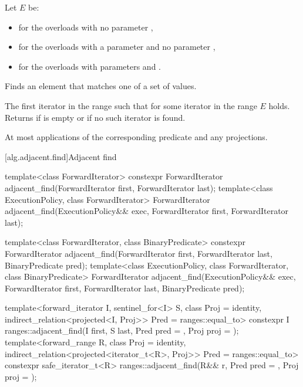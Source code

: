 \begin{itemdescr}
\pnum
Let $E$ be:
\begin{itemize}
\item {} for the overloads with no parameter ,
\item {} for the overloads with a parameter  and no parameter ,
\item {} for the overloads with parameters  and .
\end{itemize}

\pnum
\effects
Finds an element that matches one of a set of values.

\pnum
\returns
The first iterator  in the range 
such that for some iterator  in the range 
$E$ holds.
Returns 
if  is empty or
if no such iterator is found.

\pnum
\complexity
At most  applications
of the corresponding predicate and any projections.
\end{itemdescr}

[alg.adjacent.find]{Adjacent find}

%
\begin{itemdecl}
template<class ForwardIterator>
  constexpr ForwardIterator
    adjacent_find(ForwardIterator first, ForwardIterator last);
template<class ExecutionPolicy, class ForwardIterator>
  ForwardIterator
    adjacent_find(ExecutionPolicy&& exec,
                  ForwardIterator first, ForwardIterator last);

template<class ForwardIterator, class BinaryPredicate>
  constexpr ForwardIterator
    adjacent_find(ForwardIterator first, ForwardIterator last,
                  BinaryPredicate pred);
template<class ExecutionPolicy, class ForwardIterator, class BinaryPredicate>
  ForwardIterator
    adjacent_find(ExecutionPolicy&& exec,
                  ForwardIterator first, ForwardIterator last,
                  BinaryPredicate pred);

template<forward_iterator I, sentinel_for<I> S, class Proj = identity,
         indirect_relation<projected<I, Proj>> Pred = ranges::equal_to>
  constexpr I ranges::adjacent_find(I first, S last, Pred pred = {}, Proj proj = {});
template<forward_range R, class Proj = identity,
         indirect_relation<projected<iterator_t<R>, Proj>> Pred = ranges::equal_to>
  constexpr safe_iterator_t<R> ranges::adjacent_find(R&& r, Pred pred = {}, Proj proj = {});
\end{itemdecl}

